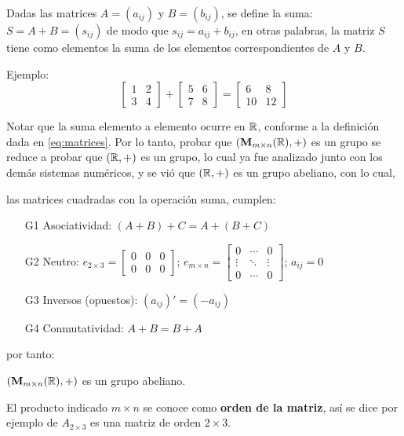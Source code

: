 Dadas las matrices $A = (a_{ij})$ y $B = (b_{ij})$, se define la suma: $S = A + B = (s_{ij})$ de modo que $s_{ij} = a_{ij} + b_{ij}$, en otras palabras, la matriz $S$ tiene como elementos la suma de los elementos correspondientes de $A$ y $B$.

Ejemplo:
\[ \begin{bmatrix}
	1 & 2\\
	3 & 4
\end{bmatrix} + \begin{bmatrix}
	5 & 6\\
	7 & 8
\end{bmatrix} = \begin{bmatrix}
	6 & 8\\
	10 & 12
\end{bmatrix} \]

Notar que la suma elemento a elemento ocurre en $\mathbb{R}$, conforme a la definición dada en \eqref{eq:matrices}. Por lo tanto, probar que $(\mathbf{M}_{m\times n}(\mathbb{R}), +)$ es un grupo se reduce a probar que $(\mathbb{R}, +)$ es un grupo, lo cual ya fue analizado junto con los demás sistemas numéricos, y se vió que $(\mathbb{R}, +)$ es un grupo abeliano, con lo cual,

las matrices cuadradas con la operación suma, cumplen:
\begin{itemize}
	\item[G1] Asociatividad: $(A + B) + C = A + (B + C)$ \quad \cmark 
	\item[G2] Neutro: $e_{2\times 3} = \begin{bmatrix} 0 & 0 & 0\\0 & 0 & 0 \end{bmatrix}$;
	$e_{m \times n} = \begin{bmatrix} 0 & \cdots & 0\\ \vdots & \ddots & \vdots\\ 0 & \cdots & 0 \end{bmatrix}$; $a_{ij} = 0$ \quad \cmark 
	\item[G3] Inversos (opuestos):  $(a_{ij})' = (-a_{ij})$ \quad \cmark 
	\item[G4] Conmutatividad: $A + B = B + A$ \quad \cmark 
\end{itemize}
por tanto:

\begin{center}
	$\left( \mathbf{M}_{m \times n}(\mathbb{R}), + \right)$ es un grupo abeliano.
\end{center}

El producto indicado $m \times n$ se conoce como \textbf{orden de la matriz}, así se dice por ejemplo de $A_{2 \times 3}$ es una matriz de orden $2 \times 3$.

